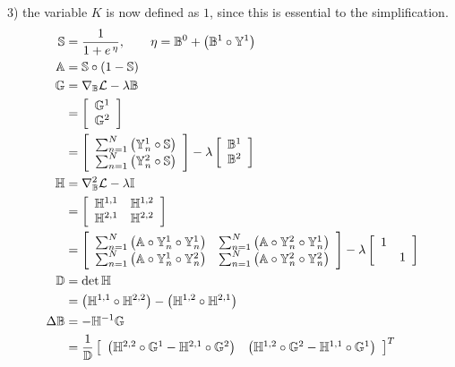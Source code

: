 3) the variable $K$ is now defined as $1$, since this is essential to the simplification.
\begin{align}
\mathbb{S} &= \frac{1}{1+e^{\thinspace\eta}},\qquad \eta = \mathbb{B}^0 + \left(\mathbb{B}^1\circ\mathbb{Y}^1\right)\\
\mathbb{A} &= \mathbb{S}\circ\left(1-\mathbb{S}\right)\\
\mathbb{G} &= \nabla_{\mathbb{B}}\mathcal{L} - \lambda\mathbb{B} \nonumber \\
&= \left[\begin{array}{c}
\mathbb{G}^1 \\ \mathbb{G}^2
\end{array}\right] \nonumber \\
&= \left[\begin{array}{c}
\sum_{n=1}^{N}\left( \mathbb{Y}_n^1\circ\mathbb{S} \right) \\
\sum_{n=1}^{N}\left( \mathbb{Y}_n^2\circ\mathbb{S} \right)
\end{array}\right] - \lambda\left[\begin{array}{c} \mathbb{B}^1 \\ \mathbb{B}^2\end{array}\right]\\
\mathbb{H} &= \nabla_{\mathbb{B}}^2\mathcal{L} -\lambda\mathbb{I} \nonumber \\
&= \left[\begin{array}{cc}
\mathbb{H}^{1,1} & \mathbb{H}^{1,2} \\ \mathbb{H}^{2,1} & \mathbb{H}^{2,2}
\end{array}\right] \nonumber \\
&= \left[\begin{array}{cc}
\sum_{n=1}^{N}\left( \mathbb{A}\circ\mathbb{Y}_n^1\circ\mathbb{Y}_n^1 \right) & 
\sum_{n=1}^{N}\left( \mathbb{A}\circ\mathbb{Y}_n^2\circ\mathbb{Y}_n^1 \right) \\
\sum_{n=1}^{N}\left( \mathbb{A}\circ\mathbb{Y}_n^1\circ\mathbb{Y}_n^2 \right) & 
\sum_{n=1}^{N}\left( \mathbb{A}\circ\mathbb{Y}_n^2\circ\mathbb{Y}_n^2 \right)
\end{array}\right] - \lambda\left[\begin{array}{cc} 1 & \\ & 1\end{array}\right]\\
\mathbb{D} &= \det{\mathbb{H}} \nonumber \\
&= \left(\mathbb{H}^{1,1}\circ\mathbb{H}^{2,2}\right) - \left(\mathbb{H}^{1,2}\circ\mathbb{H}^{2,1}\right) \\
\Delta\mathbb{B} &= -\mathbb{H}^{-1}\mathbb{G} \nonumber \\
&= \dfrac{1}{\mathbb{D}} \left[\begin{array}{cc}
\left(\mathbb{H}^{2,2}\circ\mathbb{G}^{1} - \mathbb{H}^{2,1}\circ\mathbb{G}^{2} \right) & 
\left(\mathbb{H}^{1,2}\circ\mathbb{G}^{2} - \mathbb{H}^{1,1}\circ\mathbb{G}^{1} \right)
\end{array}\right]^{T}
\end{align}
